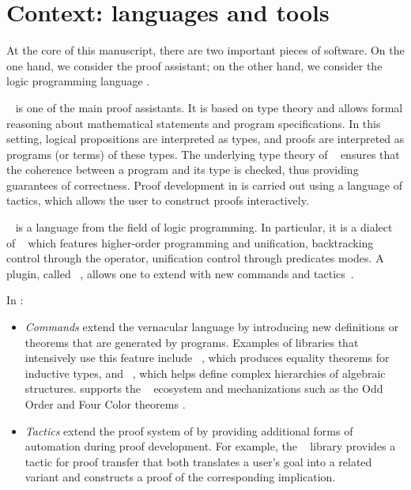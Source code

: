 \chapter{Context: languages and tools}
\label{chap:context}

At the core of this manuscript, there are two important pieces of software.
On the one hand, we
consider the \rocq proof assistant; on the other hand,
we consider the logic programming language \elpi.

\rocq~\cite{coqart} is one of the main proof assistants. It is based on
type theory and allows formal reasoning about mathematical statements
and program specifications. In this setting, logical propositions are
interpreted as types, and proofs are interpreted as programs (or terms) of
these types. The underlying type theory of \rocq~\cite{coq-huet} ensures that the coherence
between a program and its type is checked, thus providing
guarantees of correctness.
Proof development in \rocq is carried out using a language of tactics, which
allows the user to construct proofs interactively.

\elpi~\cite{dunchev15} is a language from the field of logic
programming. In particular, it is a dialect of \lprolog~\cite{miller1988} which features
higher-order programming and unification, backtracking control
through the \cut operator, unification control through predicates modes. 
A plugin, called \rocqelpi~\cite{tassi2018}, allows one to extend \rocq
with new commands and tactics~\cite{krebbers2025,maas2024,tassi2023}.

In \rocqelpi:

\begin{itemize}
  \item \emph{Commands} extend the \rocq vernacular language by introducing new definitions or
  theorems that are generated by \elpi programs. Examples of
  libraries that intensively use this feature include \derive~\cite{tassi2019},
  which produces equality theorems for inductive types, and \hb~\cite{hb}, which helps define
  complex hierarchies of algebraic structures.
  \hb supports the \mc~\cite{assia2022} ecosystem and
  mechanizations such as the Odd Order and Four Color theorems
  \cite{gonthier2013,gonthier2023}.

  \item \emph{Tactics} extend the proof system of \rocq{} by providing
  additional forms of automation during proof development. For example, the
  \trocq~\cite{enzo2023,enzo2024} library provides a tactic for proof transfer
  that both translates a user's goal into a related variant and constructs a
  proof of the corresponding implication.
\end{itemize}

